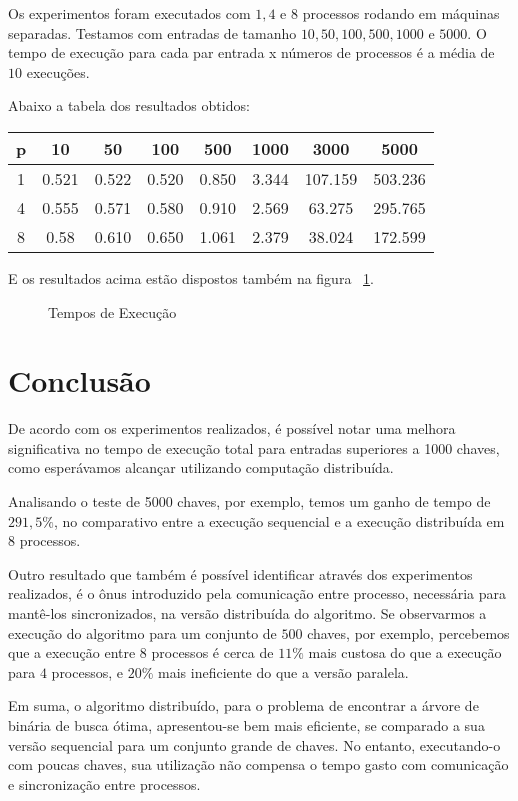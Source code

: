 \documentclass[12pt]{article}
\begin{document}
Os experimentos foram executados com $1, 4$ e $8$ processos rodando em máquinas separadas.
Testamos com entradas de tamanho $10, 50, 100, 500, 1000$ e $5000$.  O tempo 
de execução para cada par entrada x números de processos é a média de $10$
execuções.

Abaixo a tabela dos resultados obtidos:
\begin{center}
\begin{tabular}{c|c|c|c|c|c|c|c}
p & 10 & 50 & 100 & 500 & 1000 & 3000 & 5000 \\
\hline
1 & 0.521 & 0.522 & 0.520 & 0.850 & 3.344 & 107.159 & 503.236 \\
\hline
4 & 0.555 &  0.571 & 0.580 & 0.910 & 2.569 & 63.275 & 295.765 \\
\hline
8 & 0.58 & 0.610 & 0.650 & 1.061 & 2.379 & 38.024 & 172.599 \\
\end{tabular}
\end{center}

E os resultados acima estão dispostos também na figura
~\ref{fig:resultados}.


\clearpage
\begin{figure}
	\begin{center}
		
	\end{center}
\caption{Tempos de Execução}	
\label{fig:resultados}
\end{figure}


\section{Conclusão}

De acordo com os experimentos realizados, é possível notar uma melhora significativa 
no tempo de execução total para entradas superiores a 1000 chaves, como esperávamos 
alcançar utilizando computação distribuída. 

Analisando o teste de 5000 chaves, por exemplo, temos um ganho de tempo de $291,5\%$, 
no comparativo entre a execução sequencial e a execução distribuída em $8$ processos.

Outro resultado que também é possível identificar através dos experimentos realizados, 
é o ônus introduzido pela comunicação entre processo, necessária para mantê-los 
sincronizados, na versão distribuída do algoritmo. Se observarmos a execução do algoritmo 
para um conjunto de $500$ chaves, por exemplo, percebemos que a execução entre $8$ processos 
é cerca de $11\%$ mais custosa do que a execução para $4$ processos, e $20\%$ mais ineficiente do 
que a versão paralela.

Em suma, o algoritmo distribuído, para o problema de encontrar a árvore de binária de busca
ótima, apresentou-se bem mais eficiente, se comparado a sua versão sequencial para um conjunto
grande de chaves. No entanto, executando-o com poucas chaves, sua utilização não compensa o tempo 
gasto com comunicação e sincronização entre processos.




\end{document}
